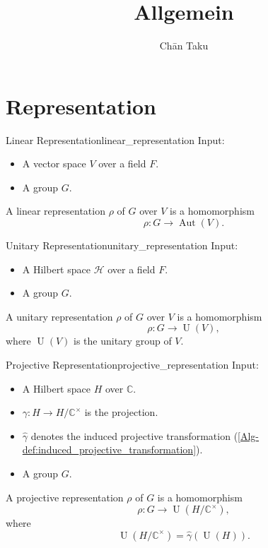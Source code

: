 \documentclass{article}
\title{Allgemein}
\author{Ch\=an Taku}
\begin{document}
\maketitle

\section{Representation}

\begin{definition}{Linear Representation}{linear_representation}
    Input:
    \begin{itemize}
        \item A vector space $V$ over a field $F$.
        \item A group $G$.
    \end{itemize}
    A linear representation $\rho$ of $G$ over $V$ is a homomorphism
    \[ \rho: G \rightarrow \operatorname{Aut}(V). \]
\end{definition}
\begin{definition}{Unitary Representation}{unitary_representation}
    Input:
    \begin{itemize}
        \item A Hilbert space $\mathcal{H}$ over a field $F$.
        \item A group $G$.
    \end{itemize}
    A unitary representation $\rho$ of $G$ over $V$ is a homomorphism
    \[ \rho: G \rightarrow \operatorname{U}(V), \]
    where $\operatorname{U}(V)$ is the unitary group of $V$.
\end{definition}
\begin{definition}{Projective Representation}{projective_representation}
    Input:
    \begin{itemize}
        \item A Hilbert space $H$ over $\mathbb{C}$.
        \item $\gamma: H\rightarrow H/\mathbb{C}^\times$ is the projection.
        \item $\hat{\gamma}$ denotes the induced projective transformation (\cref{Alg-def:induced_projective_transformation}).
        \item A group $G$.
    \end{itemize}
    A projective representation $\rho$ of $G$ is a homomorphism
    \[ \rho: G \rightarrow \operatorname{U}(H/\mathbb{C}^\times), \]
    where
    \[ \operatorname{U}(H/\mathbb{C}^\times) = \hat{\gamma}(\operatorname{U}(H)). \]
\end{definition}
\end{document}
